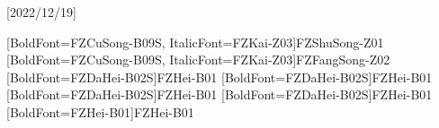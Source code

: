 
[2022/12/19]

\setsansfont{TeX Gyre Heros}	%

[BoldFont=FZCuSong-B09S, ItalicFont=FZKai-Z03]{FZShuSong-Z01}
[BoldFont=FZCuSong-B09S, ItalicFont=FZKai-Z03]{FZFangSong-Z02}
[BoldFont=FZDaHei-B02S]{FZHei-B01}
[BoldFont=FZDaHei-B02S]{FZHei-B01}
[BoldFont=FZDaHei-B02S]{FZHei-B01}
[BoldFont=FZDaHei-B02S]{FZHei-B01}
[BoldFont=FZHei-B01]{FZHei-B01}


\newcommand\kaishu{\CJKfamily{kai}} %
\newcommand\songti{\CJKfamily{song}} %
\newcommand\heiti{\CJKfamily{hei}}	%
\newcommand\thmheiti{\CJKfamily{hei2}}	%
\newcommand\fangsong{\CJKfamily{fangsong}} %
\renewcommand{\thepart}{\Alph{part}} %
\renewcommand{\em}{\bfseries\mathversion{bold}\CJKfamily{emfont}} %

